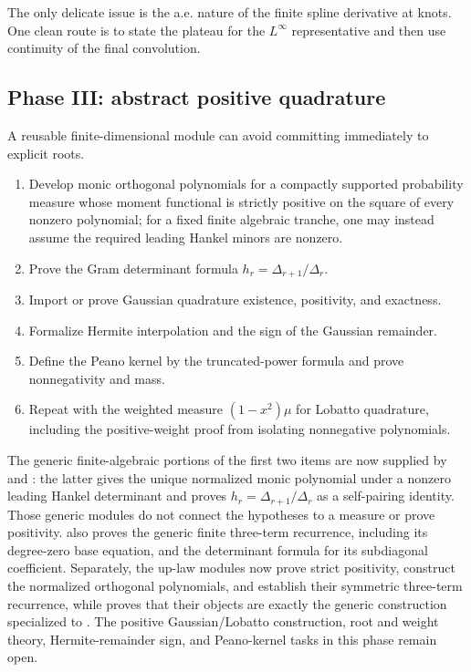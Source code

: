 \documentclass[11pt]{article}
\numberwithin{equation}{section}
\theoremstyle{definition}
\theoremstyle{remark}
\begin{document}
The only delicate issue is the a.e. nature of the finite spline derivative at knots.  One clean route is to state the plateau for the $L^\infty$ representative and then use continuity of the final convolution.

\subsection{Phase III: abstract positive quadrature}

A reusable finite-dimensional module can avoid committing immediately to explicit roots.

\begin{enumerate}
\item Develop monic orthogonal polynomials for a compactly supported probability measure whose moment functional is strictly positive on the square of every nonzero polynomial; for a fixed finite algebraic tranche, one may instead assume the required leading Hankel minors are nonzero.
\item Prove the Gram determinant formula $h_r=\Delta_{r+1}/\Delta_r$.
\item Import or prove Gaussian quadrature existence, positivity, and exactness.
\item Formalize Hermite interpolation and the sign of the Gaussian remainder.
\item Define the Peano kernel by the truncated-power formula and prove nonnegativity and mass.
\item Repeat with the weighted measure $(1-x^2)\mu$ for Lobatto quadrature, including the positive-weight proof from isolating nonnegative polynomials.
\end{enumerate}

The generic finite-algebraic portions of the first two items are now supplied
by  and : the latter gives
the unique normalized monic
polynomial under a nonzero leading Hankel determinant and proves
\(h_r=\Delta_{r+1}/\Delta_r\) as a self-pairing identity.  Those generic
modules do not connect the hypotheses to a measure or prove positivity.
 also proves the generic finite three-term
recurrence, including its degree-zero base equation, and the determinant
formula for its subdiagonal coefficient.
Separately, the up-law modules now prove strict positivity, construct the
normalized orthogonal polynomials, and establish their symmetric three-term
recurrence, while  proves that their
objects are exactly the generic construction specialized to
.  The positive Gaussian/Lobatto construction, root and weight
theory, Hermite-remainder sign, and Peano-kernel tasks in this phase remain
open.
\end{document}
